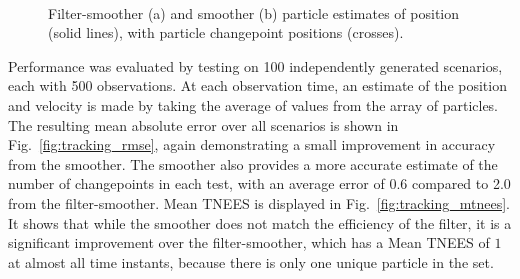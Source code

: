 \documentclass[10pt,twocolumn,twoside]{IEEEtran}
\begin{document}
\begin{figure}[!t]
\centering
{} \\
\caption{Filter-smoother (a) and smoother (b) particle estimates of position (solid lines), with particle changepoint positions (crosses). }
\label{fig:2D_particle_results}
\end{figure}
%
Performance was evaluated by testing on 100 independently generated scenarios, each with 500 observations. At each observation time, an estimate of the position and velocity is made by taking the average of values from the array of particles. The resulting mean absolute error over all scenarios is shown in Fig.~\ref{fig:tracking_rmse}, again demonstrating a small improvement in accuracy from the smoother. The smoother also provides a more accurate estimate of the number of changepoints in each test, with an average error of 0.6 compared to 2.0 from the filter-smoother. Mean TNEES is displayed in Fig.~\ref{fig:tracking_mtnees}. It shows that while the smoother does not match the efficiency of the filter, it is a significant improvement over the filter-smoother, which has a Mean TNEES of $1$ at almost all time instants, because there is only one unique particle in the set. %
\end{document}
